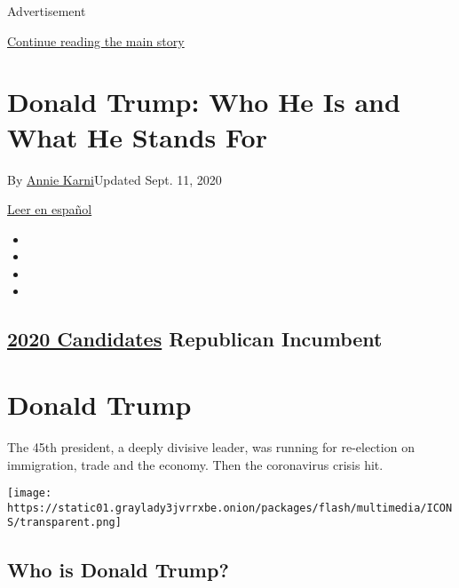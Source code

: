 Advertisement

\protect\hyperlink{after-top}{Continue reading the main story}

\hypertarget{donald-trump-who-he-is-and-what-he-stands-for}{%
\section{Donald Trump: Who He Is and What He Stands
For}\label{donald-trump-who-he-is-and-what-he-stands-for}}

By \href{https://www.nytimes3xbfgragh.onion/by/annie-karni}{Annie
Karni}Updated Sept. 11, 2020

\href{https://www.nytimes3xbfgragh.onion/es/interactive/2020/espanol/estados-unidos/donald-trump-elecciones.html}{Leer
en español}

\begin{itemize}
\item
\item
\item
\item
\end{itemize}

\hypertarget{2020-candidates--republican-incumbent-}{%
\subsection{\texorpdfstring{\href{https://www.nytimes3xbfgragh.onion/interactive/2019/us/politics/2020-presidential-candidates.html}{2020
Candidates} Republican Incumbent
}{2020 Candidates  Republican Incumbent }}\label{2020-candidates--republican-incumbent-}}

\hypertarget{donald-trump}{%
\section{Donald Trump}\label{donald-trump}}

The 45th president, a deeply divisive leader, was running for
re-election on immigration, trade and the economy. Then the coronavirus
crisis hit.

\texttt{[image: https://static01.graylady3jvrrxbe.onion/packages/flash/multimedia/ICONS/transparent.png]}

\hypertarget{who-is-donald-trump}{%
\subsection{Who is Donald Trump?}\label{who-is-donald-trump}}

